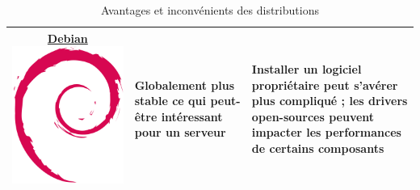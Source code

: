 \begin{table}[ht]
\begin{tabularx}{\textwidth}{|C|X|X|}
		\href{https://www.debian.org}{\textbf{Debian}\vspace{5px} \centering \includegraphics[width=0.7\linewidth]{images/Debian}} & Globalement plus stable ce qui peut-être intéressant pour un serveur & Installer un logiciel propriétaire peut s'avérer plus compliqué ; les drivers open-sources peuvent impacter les performances de certains composants \\
		\hline
	\end{tabularx}
	\caption{Avantages et inconvénients des distributions}
	\label{tab:distrib}
\end{table}


